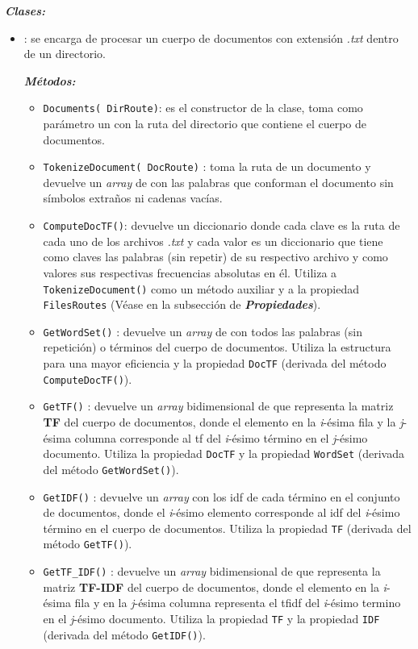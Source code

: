 \documentclass{article}
\begin{document}
\textbf{\textit{Clases:}}
\begin{itemize}
\item {} : se encarga de procesar un cuerpo de documentos con extensión \textit{.txt} dentro de un directorio.

\textbf{\textit{Métodos:}}
\begin{itemize}
\item \texttt{Documents( \texttt{DirRoute})}: es el constructor de la clase, toma como parámetro un  con la ruta del directorio que contiene el cuerpo de documentos. 
\item \texttt{TokenizeDocument( \texttt{DocRoute})} : toma la ruta de un documento y devuelve un \textit{array} de  con las palabras que conforman el documento sin símbolos extraños ni cadenas vacías.
\item \texttt{ComputeDocTF()}: devuelve un diccionario donde cada clave es la ruta de cada uno de los archivos \textit{.txt} y cada valor es un  diccionario que tiene como
claves las palabras (sin repetir) de su respectivo archivo y como valores sus respectivas frecuencias
absolutas en él. Utiliza a \texttt{TokenizeDocument()} como un método auxiliar y a la propiedad \texttt{FilesRoutes} (Véase en la subsección de \textit{\textbf{Propiedades}}).
\item \texttt{GetWordSet()} :  devuelve un \textit{array} de  con todos las palabras (sin repetición) o términos del cuerpo de documentos. Utiliza la estructura  para una mayor eficiencia y la propiedad \texttt{DocTF} (derivada del método \texttt{ComputeDocTF()}).
\item \texttt{GetTF()} : devuelve un \textit{array} bidimensional de  que representa la matriz \textbf{TF} del cuerpo de documentos, donde el elemento en la \textit{i}-ésima fila y la \textit{j}-ésima columna corresponde al tf del \textit{i}-ésimo término en el \textit{j}-ésimo documento. Utiliza la propiedad \texttt{DocTF} y la propiedad \texttt{WordSet} (derivada del método \texttt{GetWordSet()}).
\item \texttt{GetIDF()} : devuelve un \textit{array} con los idf de cada término en el conjunto de documentos, donde el \textit{i}-ésimo elemento corresponde al idf del \textit{i}-ésimo término en el cuerpo de documentos. Utiliza la propiedad \texttt{TF} (derivada del método \texttt{GetTF()}).
\item \texttt{GetTF\_IDF()} : devuelve un \textit{array} bidimensional de  que representa la matriz \textbf{TF-IDF} del cuerpo de documentos, donde el elemento en la \textit{i}-ésima fila y en la \textit{j}-ésima columna representa el tfidf del \textit{i}-ésimo termino en el \textit{j}-ésimo documento. Utiliza la propiedad \texttt{TF} y la propiedad \texttt{IDF} (derivada del método \texttt{GetIDF()}).

\end{itemize}
\end{itemize}
\end{document}

